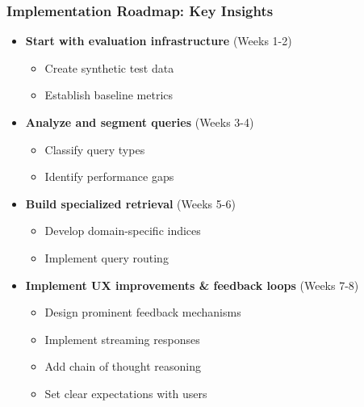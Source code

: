 \begin{frame}
    \frametitle{Implementation Roadmap: Key Insights}
    
    \begin{center}
    \end{center}
    
    \begin{itemize}
        \item \textbf{Start with evaluation infrastructure} (Weeks 1-2)
        \begin{itemize}
            \item Create synthetic test data
            \item Establish baseline metrics
        \end{itemize}
        \item \textbf{Analyze and segment queries} (Weeks 3-4)
        \begin{itemize}
            \item Classify query types
            \item Identify performance gaps
        \end{itemize}
        \item \textbf{Build specialized retrieval} (Weeks 5-6)
        \begin{itemize}
            \item Develop domain-specific indices
            \item Implement query routing
        \end{itemize}
        \item \textbf{Implement UX improvements \& feedback loops} (Weeks 7-8)
        \begin{itemize}
            \item Design prominent feedback mechanisms
            \item Implement streaming responses
            \item Add chain of thought reasoning
            \item Set clear expectations with users
        \end{itemize}
    \end{itemize}
    
    \begin{center}
    \end{center}
\end{frame}

